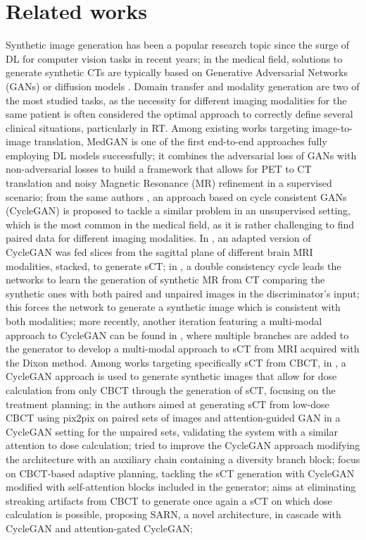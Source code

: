 \section{Related works}
\label{sec:related}
Synthetic image generation has been a popular research topic since the surge of DL for computer vision tasks in recent years; in the medical field, solutions to generate synthetic CTs are typically based on Generative Adversarial Networks (GANs) or diffusion models \cite{Zhou2023, Wolleb2022}.
Domain transfer and modality generation are two of the most studied tasks, as the necessity for different imaging modalities for the same patient is often considered the optimal approach to correctly define several clinical situations, particularly in RT. 
Among existing works targeting image-to-image translation, MedGAN is one of the first end-to-end approaches \cite{Armanious2018} fully employing DL models successfully; it combines the adversarial loss of GANs with non-adversarial losses to build a framework that allows for PET to CT translation and noisy Magnetic Resonance (MR) refinement in a supervised scenario; from the same authors \cite{armanious2019}, an approach based on cycle consistent GANs (CycleGAN) \cite{zhu2017unpaired} is proposed to tackle a similar problem in an unsupervised setting, which is the most common in the medical field, as it is rather challenging to find paired data for different imaging modalities. 
In \cite{Wolterink2017}, an adapted version of CycleGAN was fed slices from the sagittal plane of different brain MRI modalities, stacked, to generate sCT; in \cite{Jin2019}, a double consistency cycle leads the networks to learn the generation of synthetic MR from CT comparing the synthetic ones with both paired and unpaired images in the discriminator's input; this forces the network to generate a synthetic image which is consistent with both modalities; more recently, another iteration featuring a multi-modal approach to CycleGAN can be found in \cite{Crespi2024}, where multiple branches are added to the generator to develop a multi-modal approach to sCT from MRI acquired with the Dixon method. 
Among works targeting specifically sCT from CBCT, in \cite{Maspero2020}, a CycleGAN approach is used to generate synthetic images that allow for dose calculation from only CBCT through the generation of sCT, focusing on the treatment planning; in \cite{Gao2021} the authors aimed at generating sCT from low-dose CBCT using pix2pix\cite{isola2017image} on paired sets of images and attention-guided GAN\cite{Tang2019} in a CycleGAN setting for the unpaired sets, validating the system with a similar attention to dose calculation; \cite{Deng2023} tried to improve the CycleGAN approach modifying the architecture with an auxiliary chain containing a diversity branch block; \cite{Liu2020} focus on CBCT-based adaptive planning, tackling the sCT generation with CycleGAN modified with self-attention blocks included in the generator; \cite{Gao2023} aims at eliminating streaking artifacts from CBCT to generate once again a sCT on which dose calculation is possible, proposing SARN, a novel architecture, in cascade with CycleGAN and attention-gated CycleGAN; 
